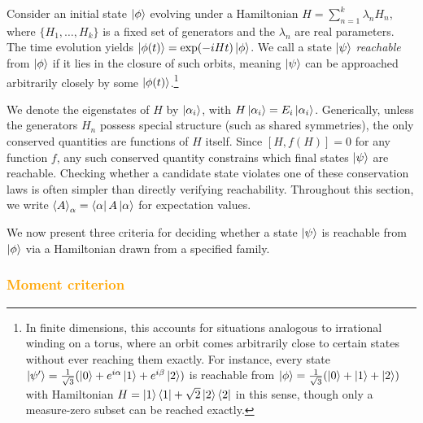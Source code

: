 \documentclass[aps,prx,reprint,superscriptaddress,footnote, twocolumn,notitlepage]{revtex4-2}
\newcommand{\ko}[1]{\textcolor{orange}{#1}}
\newcommand{\todoko}[1]{\ko{$\diamondsuit$ #1}}
\begin{document}


Consider an initial state $\ket{\phi}$ evolving under a Hamiltonian $H = \sum_{n=1}^{k} \lambda_n H_n$, where $\{H_1, \ldots, H_k\}$ is a fixed set of generators and the $\lambda_n$ are real parameters. The time evolution yields $\ket{\phi(t)} = \exp(-iHt)\ket{\phi}$. We call a state $\ket{\psi}$ \emph{reachable} from $\ket{\phi}$ if it lies in the closure of such orbits, meaning $\ket{\psi}$ can be approached arbitrarily closely by some $\ket{\phi(t)}$.\footnote{In finite dimensions, this accounts for situations analogous to irrational winding on a torus, where an orbit comes arbitrarily close to certain states without ever reaching them exactly. For instance, every state $\ket{\psi'} = \frac{1}{\sqrt{3}}(\ket{0} + e^{i\alpha}\ket{1} + e^{i\beta}\ket{2})$ is reachable from $\ket{\phi} = \frac{1}{\sqrt{3}}(\ket{0} + \ket{1} + \ket{2})$ with Hamiltonian $H = \ket{1}\bra{1} + \sqrt{2}\ket{2}\bra{2}$ in this sense, though only a measure-zero subset can be reached exactly.}

We denote the eigenstates of $H$ by $\ket{\alpha_i}$, with $H\ket{\alpha_i} = E_i\ket{\alpha_i}$. Generically, unless the generators $H_n$ possess special structure (such as shared symmetries), the only conserved quantities are functions of $H$ itself. Since $[H, f(H)] = 0$ for any function $f$, any such conserved quantity constrains which final states $\ket{\psi}$ are reachable. Checking whether a candidate state violates one of these conservation laws is often simpler than directly verifying reachability. Throughout this section, we write $\braket{A}_\alpha = \bra{\alpha}A\ket{\alpha}$ for expectation values.

We now present three criteria for deciding whether a state $\ket{\psi}$
 is reachable from $\ket{\phi}$ via a Hamiltonian drawn from a specified family.
\subsubsection{\ko{Moment criterion}}
\end{document}
